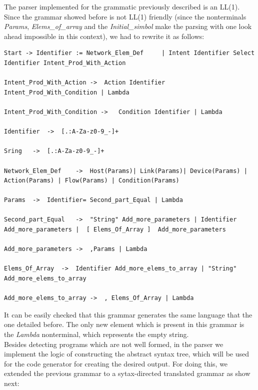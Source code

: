 The parser implemented for the grammatic previously described is an LL(1). Since the grammar showed before is not LL(1) friendly (since the nonterminals \textit{Params}, \textit{Elems\_of\_array} and the \textit{Initial\_simbol} make the parsing with one look ahead impossible in this context), we had to rewrite it as follows:

\begin{lstlisting}[breaklines=true]
Start -> Identifier := Network_Elem_Def     | Intent Identifier Select Identifier Intent_Prod_With_Action

Intent_Prod_With_Action ->	Action Identifier Intent_Prod_With_Condition | Lambda

Intent_Prod_With_Condition ->	Condition Identifier | Lambda

Identifier	->	[.:A-Za-z0-9_-]+

Sring	->	[.:A-Za-z0-9_-]+

Network_Elem_Def	->	Host(Params)| Link(Params)| Device(Params) | Action(Params) | Flow(Params) | Condition(Params)

Params	->	Identifier= Second_part_Equal | Lambda

Second_part_Equal	->	"String" Add_more_parameters | Identifier Add_more_parameters |  [ Elems_Of_Array ]  Add_more_parameters 

Add_more_parameters	->	,Params | Lambda

Elems_Of_Array	->	Identifier Add_more_elems_to_array | "String" Add_more_elems_to_array 

Add_more_elems_to_array	->	, Elems_Of_Array | Lambda

\end{lstlisting}

It can be easily checked that this grammar generates the same language that the one detailed before. The only new element which is present in this grammar is the \textit{Lambda} nonterminal, which represents the empty string.\\
Besides detecting programs which are not well formed, in the parser we implement the logic of constructing the abstract syntax tree, which will be used for the code generator for creating the desired output. For doing this, we extended the previous grammar to a sytax-directed translated grammar as show next:

